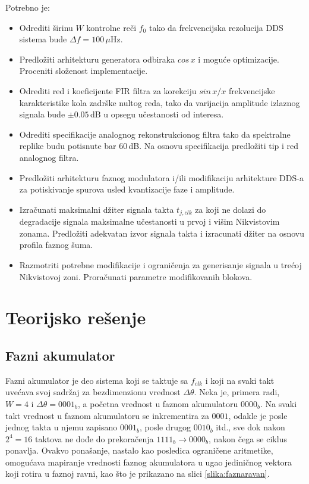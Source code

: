 \documentclass[conference]{IEEEtran}
\begin{document}
Potrebno je:
\begin{itemize}
	\item Odrediti širinu $W$ kontrolne reči $f_0$ tako da frekvencijska rezolucija DDS sistema bude $\Delta f = 100\,\mu$Hz.
	\item Predložiti arhitekturu generatora odbiraka $cos\,x$ i moguće optimizacije. Proceniti složenost implementacije.
	\item Odrediti red i koeficijente FIR filtra za korekciju $sin\,x/x$ frekvencijske karakteristike kola zadrške nultog reda, tako da varijacija amplitude izlaznog signala bude $\pm 0.05$\,dB u opsegu učestanosti od interesa.
	\item Odrediti specifikacije analognog rekonstrukcionog filtra tako da spektralne replike budu potisnute bar $60$\,dB. Na osnovu specifikacija predložiti tip i red analognog filtra.
	\item Predložiti arhitekturu faznog modulatora i/ili modifikaciju arhitekture DDS-a za potiskivanje spurova usled kvantizacije faze i amplitude.
	\item Izračunati maksimalni džiter signala takta $t_{j,clk}$ za koji ne dolazi do degradacije signala maksimalne učestanosti u prvoj i višim Nikvistovim zonama. Predložiti adekvatan izvor signala takta i izracunati džiter na osnovu profila faznog šuma.
	\item Razmotriti potrebne modifikacije i ograničenja za generisanje signala u trećoj Nikvistovoj zoni. Proračunati parametre modifikovanih blokova.
\end{itemize}

\section{Teorijsko rešenje}
\subsection{Fazni akumulator}
Fazni akumulator je deo sistema koji se taktuje sa $f_{clk}$ i koji na svaki takt uvećava svoj sadržaj za bezdimenzionu vrednost $\Delta \theta$. Neka je, primera radi, $W=4$ i $\Delta \theta=0001_b$, a početna vrednost u faznom akumulatoru $0000_b$. Na svaki takt vrednost u faznom akumulatoru se inkrementira za $0001$, odakle je posle jednog takta u njemu zapisano $0001_b$, posle drugog $0010_b$ itd., sve dok nakon $2^4=16$ taktova ne dođe do prekoračenja $1111_b\rightarrow 0000_b$, nakon čega se ciklus ponavlja. Ovakvo ponašanje, nastalo kao posledica ograničene aritmetike, omogućava mapiranje vrednosti faznog akumulatora u ugao jediničnog vektora koji rotira u faznoj ravni, kao što je prikazano na slici \ref{slika:faznaravan}. 
\end{document}
